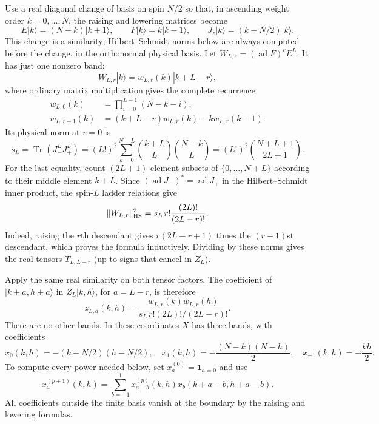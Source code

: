 \documentclass[11pt,a4paper]{article}
\begin{document}
Use a real diagonal change of basis on spin $N/2$ so that, in ascending
weight order $k=0,\ldots,N$, the raising and lowering matrices become
\[
 E|k\rangle=(N-k)|k+1\rangle,\qquad
 F|k\rangle=k|k-1\rangle,\qquad
 J_z|k\rangle=(k-N/2)|k\rangle.
\]
This change is a similarity; Hilbert--Schmidt norms below are always
computed before the change, in the orthonormal physical basis.
Let $W_{L,r}=(\operatorname{ad}F)^rE^L$. It has just one nonzero band:
\[
 W_{L,r}|k\rangle=w_{L,r}(k)|k+L-r\rangle,
\]
where ordinary matrix multiplication gives the complete recurrence
\begin{align*}
 w_{L,0}(k)&=\prod_{i=0}^{L-1}(N-k-i),\\
 w_{L,r+1}(k)&=(k+L-r)w_{L,r}(k)-k w_{L,r}(k-1).
\end{align*}
Its physical norm at $r=0$ is
\[
 s_L=\operatorname{Tr}(J_-^LJ_+^L)
 =(L!)^2\sum_{k=0}^{N-L}\binom{k+L}{L}\binom{N-k}{L}
 =(L!)^2\binom{N+L+1}{2L+1}.
\]
For the last equality, count $(2L+1)$-element subsets of
$\{0,\ldots,N+L\}$ according to their middle element $k+L$.
Since $(\operatorname{ad}J_-)^*=\operatorname{ad}J_+$ in the
Hilbert--Schmidt inner product, the spin-$L$ ladder relations give
\[
 \|W_{L,r}\|_{\rm HS}^2
 =s_L\,r!\frac{(2L)!}{(2L-r)!}.
\]
Indeed, raising the $r$th descendant gives
$r(2L-r+1)$ times the $(r-1)$st descendant, which proves the formula
inductively. Dividing by these norms gives the real tensors $T_{L,L-r}$
(up to signs that cancel in $Z_L$).

Apply the same real similarity on both tensor factors. The coefficient
of $|k+a,h+a\rangle$ in $Z_L|k,h\rangle$, for $a=L-r$, is therefore
\[
 z_{L,a}(k,h)=\frac{w_{L,r}(k)w_{L,r}(h)}
 {s_L\,r!(2L)!/(2L-r)!}.
\]
There are no other bands. In these coordinates $X$ has three bands,
with coefficients
\[
 x_0(k,h)=-(k-N/2)(h-N/2),\quad
 x_1(k,h)=-\frac{(N-k)(N-h)}2,\quad
 x_{-1}(k,h)=-\frac{kh}2.
\]
To compute every power needed below, set $x_a^{(0)}=\mathbf1_{a=0}$
and use
\[
 x_a^{(p+1)}(k,h)=\sum_{b=-1}^1x_{a-b}^{(p)}(k,h)
 x_b(k+a-b,h+a-b).
\]
All coefficients outside the finite basis vanish at the boundary by
the raising and lowering formulas.
\end{document}
